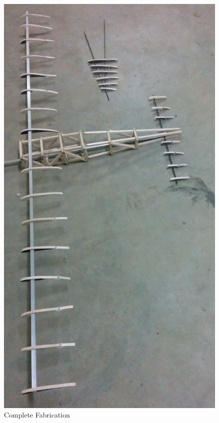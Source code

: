 \begin{figure}[H]
    \begin{center}
      \includegraphics[width=5.1in]{figures/ch4_fab.jpg}
\caption{Complete Fabrication}
       \label{fig:ch4_fab}
    \end{center}
\end{figure}


%
